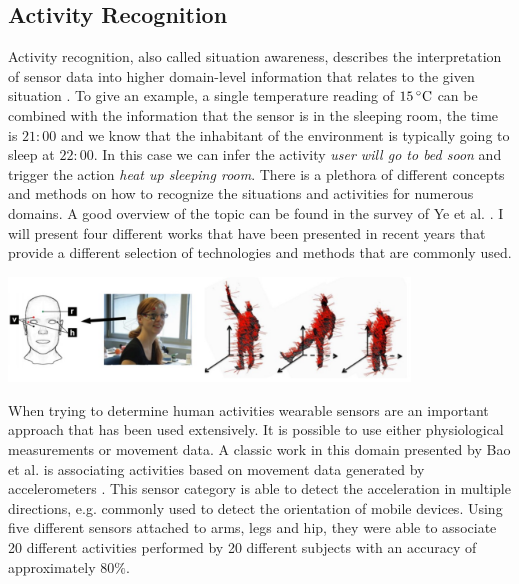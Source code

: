 \subsection{Activity Recognition}
Activity recognition, also called situation awareness, describes the interpretation of sensor data into higher domain-level information that relates to the given situation \cite{ye2012situation}. To give an example, a single temperature reading of $15\,^{\circ}{\rm C}$ can be combined with the information that the sensor is in the sleeping room, the time is $21:00$ and we know that the inhabitant of the environment is typically going to sleep at $22:00$. In this case we can infer the activity \emph{user will go to bed soon} and trigger the action \emph{heat up sleeping room}. There is a plethora of different concepts and methods on how to recognize the situations and activities for numerous domains. A good overview of the topic can be found in the survey of Ye et al. \cite{ye2012situation}. I will present four different works that have been presented in recent years that provide a different selection of technologies and methods that are commonly used.

\begin{minipage}{\linewidth}
\centering
\includegraphics[width=0.8\textwidth]{images/rel_app_activity}
\label{fig:rel_app_activity}
\end{minipage}	

When trying to determine human activities wearable sensors are an important approach that has been used extensively. It is possible to use either physiological measurements or movement data. A classic work in this domain presented by Bao et al. is associating activities based on movement data generated by accelerometers \cite{Bao2004}. This sensor category is able to detect the acceleration in multiple directions, e.g. commonly used to detect the orientation of mobile devices. Using five different sensors attached to arms, legs and hip, they were able to associate 20 different activities performed by 20 different subjects with an accuracy of approximately $80\%$.

